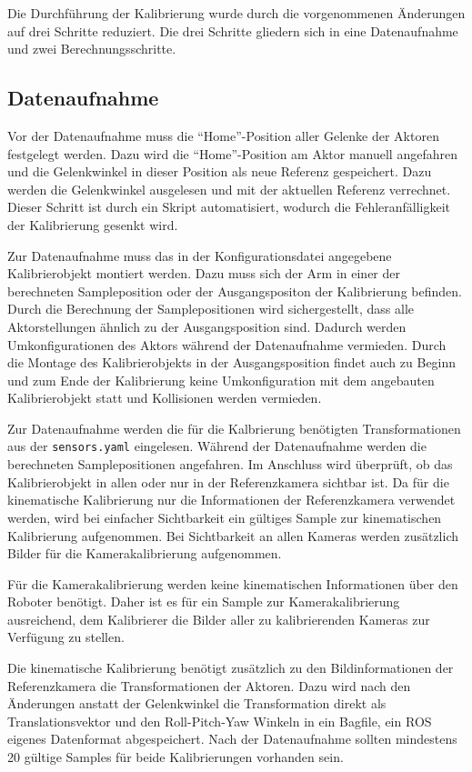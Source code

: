 Die Durchführung der Kalibrierung wurde durch die vorgenommenen Änderungen auf
drei Schritte reduziert. Die drei Schritte gliedern sich in eine 
Datenaufnahme und zwei Berechnungsschritte.
\subsection{Datenaufnahme}
\label{sub:Datenaufnahme}

Vor der Datenaufnahme muss die "`Home"'-Position aller Gelenke der Aktoren 
festgelegt werden. Dazu wird die "`Home"'-Position am Aktor manuell angefahren 
und die Gelenkwinkel in dieser Position als neue Referenz gespeichert. Dazu 
werden die Gelenkwinkel ausgelesen und mit der aktuellen Referenz verrechnet. 
Dieser Schritt ist durch ein Skript automatisiert, wodurch die
Fehleranfälligkeit der Kalibrierung gesenkt wird.

Zur Datenaufnahme muss das in der Konfigurationsdatei angegebene Kalibrierobjekt
montiert werden. Dazu muss sich der Arm in einer der berechneten Sampleposition 
oder der Ausgangspositon der Kalibrierung befinden. Durch die Berechnung der 
Samplepositionen wird sichergestellt, dass alle Aktorstellungen ähnlich zu der
Ausgangsposition sind. Dadurch werden Umkonfigurationen des Aktors während der 
Datenaufnahme vermieden. Durch die Montage des Kalibrierobjekts in der
Ausgangsposition findet auch zu Beginn und zum Ende der Kalibrierung keine 
Umkonfiguration mit dem angebauten Kalibrierobjekt statt und Kollisionen werden
vermieden.

Zur Datenaufnahme werden die für die Kalbrierung benötigten Transformationen
aus der \texttt{sensors.yaml} eingelesen. Während der Datenaufnahme werden die 
berechneten Samplepositionen angefahren. Im Anschluss wird überprüft, ob das
Kalibrierobjekt in allen oder nur in der Referenzkamera sichtbar ist. Da für die
kinematische Kalibrierung nur die Informationen der Referenzkamera verwendet
werden, wird bei einfacher Sichtbarkeit ein gültiges Sample zur kinematischen 
Kalibrierung aufgenommen. Bei Sichtbarkeit an allen Kameras werden zusätzlich 
Bilder für die Kamerakalibrierung aufgenommen.

Für die Kamerakalibrierung werden keine kinematischen Informationen über den
Roboter benötigt. Daher ist es für ein Sample zur Kamerakalibrierung ausreichend,
dem Kalibrierer die Bilder aller zu kalibrierenden Kameras zur Verfügung zu
stellen. 

Die kinematische Kalibrierung benötigt zusätzlich zu den Bildinformationen der 
Referenzkamera die Transformationen der Aktoren. Dazu wird nach den Änderungen
anstatt der Gelenkwinkel die Transformation direkt als Translationsvektor und 
den Roll-Pitch-Yaw Winkeln in ein Bagfile, ein \ac{ROS} eigenes Datenformat abgespeichert.
Nach der Datenaufnahme sollten mindestens 20 gültige Samples für beide 
Kalibrierungen vorhanden sein. 


